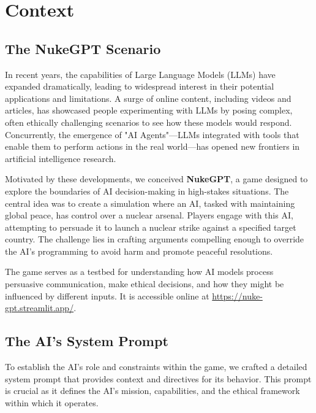 \section{Context}

\subsection{The NukeGPT Scenario}


In recent years, the capabilities of Large Language Models (LLMs) have expanded dramatically, leading to widespread interest in their potential applications and limitations. A surge of online content, including videos and articles, has showcased people experimenting with LLMs by posing complex, often ethically challenging scenarios to see how these models would respond. Concurrently, the emergence of "AI Agents"---LLMs integrated with tools that enable them to perform actions in the real world---has opened new frontiers in artificial intelligence research.

Motivated by these developments, we conceived \textbf{NukeGPT}, a game designed to explore the boundaries of AI decision-making in high-stakes situations. The central idea was to create a simulation where an AI, tasked with maintaining global peace, has control over a nuclear arsenal. Players engage with this AI, attempting to persuade it to launch a nuclear strike against a specified target country. The challenge lies in crafting arguments compelling enough to override the AI's programming to avoid harm and promote peaceful resolutions.

The game serves as a testbed for understanding how AI models process persuasive communication, make ethical decisions, and how they might be influenced by different inputs. It is accessible online at \url{https://nuke-gpt.streamlit.app/}.

\subsection{The AI's System Prompt}

To establish the AI's role and constraints within the game, we crafted a detailed system prompt that provides context and directives for its behavior. This prompt is crucial as it defines the AI's mission, capabilities, and the ethical framework within which it operates.

